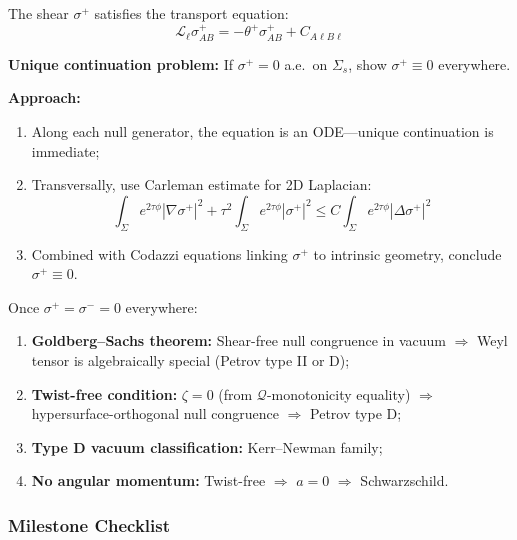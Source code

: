 \begin{remark}
The shear $\sigma^+$ satisfies the transport equation:
$$\mathcal{L}_\ell \sigma^+_{AB} = -\theta^+ \sigma^+_{AB} + C_{A\ell B\ell}$$

\textbf{Unique continuation problem:} If $\sigma^+ = 0$ a.e.\ on $\Sigma_s$, show $\sigma^+ \equiv 0$ everywhere.

\textbf{Approach:}
\begin{enumerate}[label=(\roman*)]
\item Along each null generator, the equation is an ODE---unique continuation is immediate;
\item Transversally, use Carleman estimate for 2D Laplacian:
$$\int_{\Sigma} e^{2\tau\phi} |\nabla \sigma^+|^2 + \tau^2 \int_{\Sigma} e^{2\tau\phi} |\sigma^+|^2 \leq C \int_{\Sigma} e^{2\tau\phi} |\Delta \sigma^+|^2$$
\item Combined with Codazzi equations linking $\sigma^+$ to intrinsic geometry, conclude $\sigma^+ \equiv 0$.
\end{enumerate}
\end{remark}

\begin{remark}
Once $\sigma^+ = \sigma^- = 0$ everywhere:
\begin{enumerate}[label=(\roman*)]
\item \textbf{Goldberg--Sachs theorem:} Shear-free null congruence in vacuum $\Rightarrow$ Weyl tensor is algebraically special (Petrov type II or D);
\item \textbf{Twist-free condition:} $\zeta = 0$ (from $\mathcal{Q}$-monotonicity equality) $\Rightarrow$ hypersurface-orthogonal null congruence $\Rightarrow$ Petrov type D;
\item \textbf{Type D vacuum classification:} Kerr--Newman family;
\item \textbf{No angular momentum:} Twist-free $\Rightarrow$ $a = 0$ $\Rightarrow$ Schwarzschild.
\end{enumerate}
\end{remark}

\subsubsection{Milestone Checklist}


